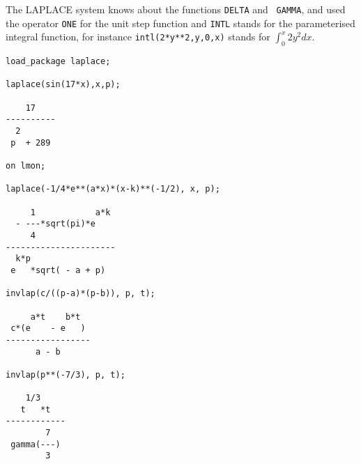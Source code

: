 The LAPLACE system knows about the functions {\tt DELTA} and {\tt
GAMMA}, and used the operator {\tt ONE} for the unit step function and
{\tt INTL} stands for the parameterised integral function, for
instance  {\tt intl(2*y**2,y,0,x)} stands for $\int^x_0 2 y^2 dx$.

\begin{verbatim}
load_package laplace;

laplace(sin(17*x),x,p);

    17
----------
  2
 p  + 289

on lmon;

laplace(-1/4*e**(a*x)*(x-k)**(-1/2), x, p);

     1            a*k
  - ---*sqrt(pi)*e
     4
----------------------
  k*p
 e   *sqrt( - a + p)

invlap(c/((p-a)*(p-b)), p, t);

     a*t    b*t
 c*(e    - e   )
-----------------
      a - b

invlap(p**(-7/3), p, t);

    1/3
   t   *t
------------
        7
 gamma(---)
        3
\end{verbatim}

